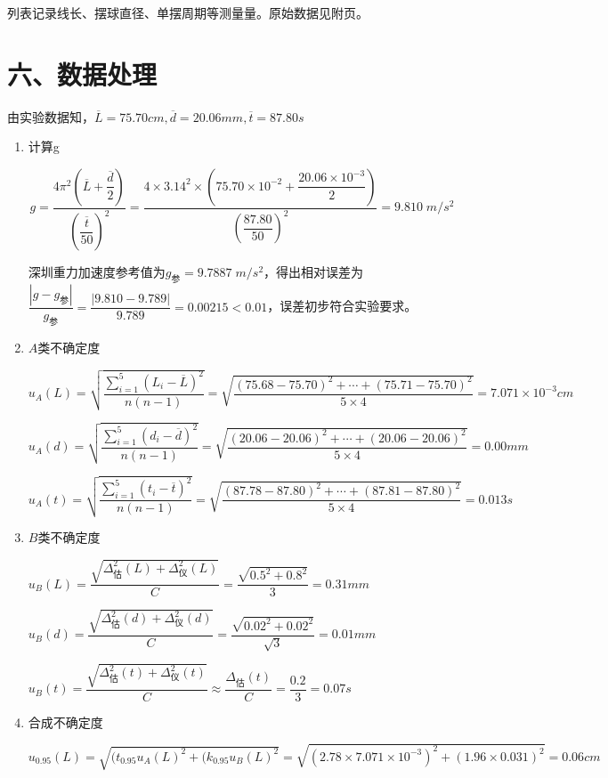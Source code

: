 \documentclass[11pt]{article}
\begin{document}
列表记录线长、摆球直径、单摆周期等测量量。原始数据见附页。

\section*{六、数据处理}

由实验数据知，$\overline{L}=75.70cm, \overline{d}=20.06mm,\overline{t}=87.80s$
\begin{enumerate}
    \item 计算g
    
    $$
    g=\dfrac{4\pi ^2\left(\overline{L}+\dfrac{\overline{d}}{2}\right)}{\left(\dfrac{\overline{t}}{50}\right)^2}=\dfrac{4\times3.14^2\times\left(75.70\times10^{-2}+\dfrac{20.06\times10^{-3}}{2}\right)}{\left(\dfrac{87.80}{50}\right)^2}=9.810\;m/s^2
    $$
    
    深圳重力加速度参考值为$g_{\text{参}}=9.7887\;m/s^2$，得出相对误差为$\dfrac{|g-g_{\text{参}}|}{g_{\text{参}}}=\dfrac{|9.810-9.789|}{9.789}=0.00215<0.01$，误差初步符合实验要求。
    
    \item $A$类不确定度
    
    $
    u_A(L) = \sqrt{\dfrac{\sum_{i=1}^5(L_i-\overline{L})^2}{n(n-1)}} = \sqrt{\dfrac{(75.68-75.70)^2+\cdots+(75.71-75.70)^2}{5\times4}}=7.071\times10^{-3}cm
    $
    
    $
    u_A(d) = \sqrt{\dfrac{\sum_{i=1}^5(d_i-\overline{d})^2}{n(n-1)}} = \sqrt{\dfrac{(20.06-20.06)^2+\cdots+(20.06-20.06)^2}{5\times4}}=0.00mm
    $
    
    $
    u_A(t) = \sqrt{\dfrac{\sum_{i=1}^5(t_i-\overline{t})^2}{n(n-1)}} = \sqrt{\dfrac{(87.78-87.80)^2+\cdots+(87.81-87.80)^2}{5\times4}}=0.013s
    $
    
    \item $B$类不确定度
    
    $
    u_B(L) = \dfrac{\sqrt{\Delta_{\text{估}}^2(L)+\Delta_{\text{仪}}^2(L)}}{C}=\dfrac{\sqrt{0.5^2+0.8^2}}{3}=0.31mm
    $
    
    $
    u_B(d) = \dfrac{\sqrt{\Delta_{\text{估}}^2(d)+\Delta_{\text{仪}}^2(d)}}{C}=\dfrac{\sqrt{0.02^2+0.02^2}}{\sqrt{3}}=0.01mm
    $
    
    $
    u_B(t) = \dfrac{\sqrt{\Delta_{\text{估}}^2(t)+\Delta_{\text{仪}}^2(t)}}{C}\approx\dfrac{\Delta_{\text{估}}(t)}{C}=\dfrac{0.2}{3}=0.07s
    $
    
    \item 合成不确定度
    
    $
    u_{0.95}(L)=\sqrt{(t_{0.95}u_A(L)^2+(k_{0.95}u_B(L)^2}=\sqrt{(2.78\times7.071\times10^{-3})^2+(1.96\times0.031)^2}=0.06cm
    $
    

\end{enumerate}
\end{document}
